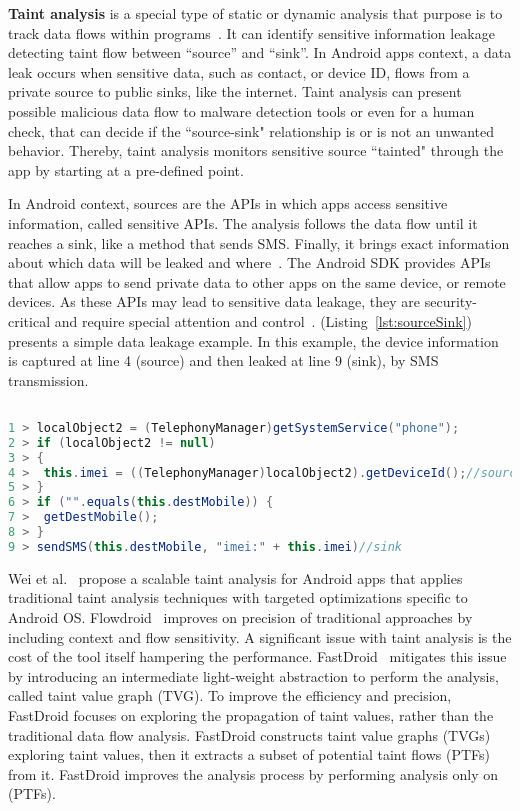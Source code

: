\textbf{Taint analysis} is a special type of static or dynamic analysis that purpose is to track data flows within programs~\cite{DBLP:conf/sigsoft/PauckBW18}. It can identify sensitive information leakage detecting taint flow between ``source'' and ``sink''. In Android apps context, a data leak occurs when sensitive data, such as contact, or device ID, flows from a private source to public sinks, like the internet. Taint analysis can present possible malicious data flow to malware detection tools or even for a human check, that can decide if the ``source-sink" relationship is or is not an unwanted behavior. Thereby, taint analysis monitors sensitive source ``tainted" through the app by starting at a pre-defined point. 

In Android context, sources are the APIs in which apps access sensitive information, called sensitive APIs. The analysis follows the data flow until it reaches a sink, like a method that sends SMS. Finally, it brings exact information about which data will be leaked and where~\cite{DBLP:conf/pldi/ArztRFBBKTOM14}. The Android SDK provides APIs that allow apps to send private data to other apps on the same device, or remote devices. As these APIs may lead to sensitive data leakage, they are security-critical and require special attention and control~\cite{DBLP:conf/osdi/EnckGCCJMS10}. (Listing~\ref{lst:sourceSink}) presents a simple data leakage example. In this example, the device information is captured at line 4 (source) and then leaked at line 9 (sink), by SMS transmission.


\begin{lstlisting}[caption={Simple Data Leakage},
      language=Java, basicstyle=\fontsize{8}{6}\selectfont\ttfamily,
      label={lst:sourceSink}]

1 > localObject2 = (TelephonyManager)getSystemService("phone");
2 > if (localObject2 != null)
3 > {
4 >  this.imei = ((TelephonyManager)localObject2).getDeviceId();//source
5 > }
6 > if ("".equals(this.destMobile)) {
7 >  getDestMobile();
8 > }
9 > sendSMS(this.destMobile, "imei:" + this.imei)//sink
\end{lstlisting}


Wei et al.~\cite{DBLP:conf/issta/HuangDMD15} propose a scalable taint analysis for Android apps that applies traditional taint analysis techniques with targeted optimizations specific to Android OS. Flowdroid~\cite{DBLP:conf/pldi/ArztRFBBKTOM14} improves on precision of traditional approaches by including context and flow sensitivity. A significant issue with taint analysis is the cost of the tool itself hampering the performance. FastDroid~\cite{DBLP:journals/compsec/ZhangTD21} mitigates this issue by introducing an intermediate light-weight abstraction to perform the analysis, called taint value graph (TVG). To improve the efficiency and precision, FastDroid focuses on exploring the propagation of taint values, rather than the traditional data flow analysis. FastDroid constructs taint value graphs (TVGs) exploring taint values, then it extracts a subset of potential taint flows (PTFs) from it. FastDroid improves the analysis process by performing analysis only on (PTFs).